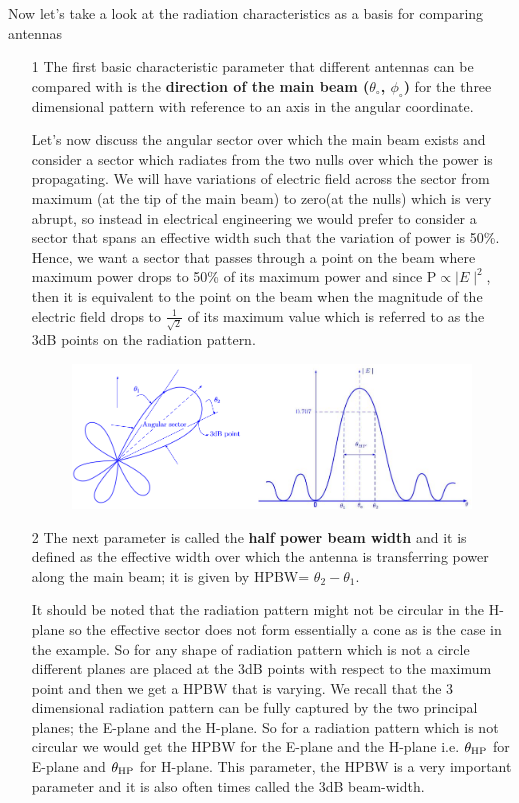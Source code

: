 Now let's take a look at the radiation characteristics as a basis for comparing antennas
\begin{enumerate}
\item[1]The first basic characteristic parameter that different antennas can be compared with is the \textbf{direction of the main beam ($\theta_\circ$, $\phi_\circ$)} for the three dimensional pattern with reference to an axis in the angular coordinate.

Let's now discuss the angular sector over which the main beam exists and consider a sector which radiates from the two nulls over which the power is propagating. We will have variations of electric field across the sector from maximum (at the tip of the main beam) to zero(at the nulls) which is very abrupt, so instead in electrical engineering we would prefer to consider a sector that spans an effective width such that the variation of power is 50\%. Hence, we want a sector that passes through a point on the beam where maximum power drops to 50\% of its maximum power and since P$\propto \mid E\mid^{2}$, then it is equivalent to the point on the beam when the magnitude of the electric field drops to $\frac{1}{\sqrt{2}}$ of its maximum value which is referred to as the 3dB points on the radiation pattern.

\begin{figure}[h]
\centering
\includegraphics[width=1\linewidth]{"./graphics/fig 10 new"}
\label{figure10}
\end{figure}
\item[2]The next parameter is called the \textbf{half power beam width} and it is defined as the effective width over which the antenna is transferring power along the main beam; it is given by HPBW= $\theta_2 -\theta_1$.

It should be noted that the radiation pattern might not be circular in the H-plane so the effective sector does not form essentially a cone as is the case in the example. So for any shape of radiation pattern which is not a circle different planes are placed at the 3dB points with respect to the maximum point and then we get a HPBW that is varying. We recall that the 3 dimensional radiation pattern can be fully captured by the two principal planes; the E-plane and the H-plane. So for a radiation pattern which is not circular we would get the HPBW for the E-plane and the H-plane i.e. $\theta_{\textnormal{HP}}$ for E-plane and $\theta_{\textnormal{HP}}$ for H-plane. This parameter, the HPBW is a very important parameter and it is also often times called the 3dB beam-width.  


\end{enumerate}
